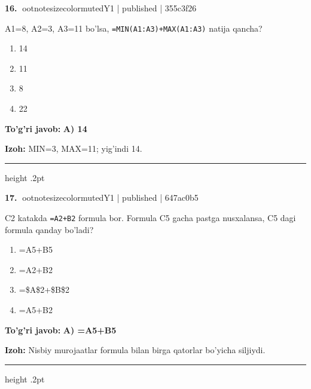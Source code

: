 \documentclass[10pt,a4paper]{article}
\begin{document}
\textbf{\color{ink}16.} {ootnotesizecolor{muted}Y1 | published | 355c3f26}
\par
A1=8, A2=3, A3=11 bo'lsa, \texttt{=MIN(A1:A3)+MAX(A1:A3)} natija qancha?
\begin{enumerate}[label=\Alph*),leftmargin=9mm]
\item 14
\item 11
\item 8
\item 22
\end{enumerate}
\begin{tcolorbox}[enhanced,breakable,colback=teal!4,colframe=teal!55!black,boxrule=0.45pt,arc=1.2mm,left=2.8mm,right=2.8mm,top=2mm,bottom=2mm]
\textbf{\color{teal}To'g'ri javob:} \textbf{A) 14}
\par\smallskip
\textbf{Izoh:} MIN=3, MAX=11; yig'indi 14.
\end{tcolorbox}
\vspace{2mm}\hrule height .2pt\vspace{2mm}

\textbf{\color{ink}17.} {ootnotesizecolor{muted}Y1 | published | 647ac0b5}
\par
C2 katakda \texttt{=A2+B2} formula bor. Formula C5 gacha pastga nusxalansa, C5 dagi formula qanday bo'ladi?
\begin{enumerate}[label=\Alph*),leftmargin=9mm]
\item =A5+B5
\item =A2+B2
\item =\$A\$2+\$B\$2
\item =A5+B2
\end{enumerate}
\begin{tcolorbox}[enhanced,breakable,colback=teal!4,colframe=teal!55!black,boxrule=0.45pt,arc=1.2mm,left=2.8mm,right=2.8mm,top=2mm,bottom=2mm]
\textbf{\color{teal}To'g'ri javob:} \textbf{A) =A5+B5}
\par\smallskip
\textbf{Izoh:} Nisbiy murojaatlar formula bilan birga qatorlar bo'yicha siljiydi.
\end{tcolorbox}
\vspace{2mm}\hrule height .2pt\vspace{2mm}
\end{document}
